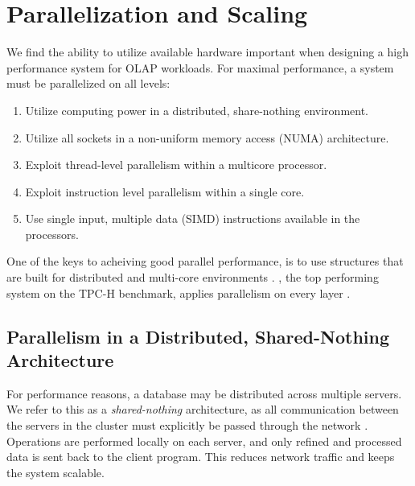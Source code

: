 \chapter{Parallelization and Scaling}
\label{chap:Parallelization and Scaling}

We find the ability to utilize available hardware important when designing a high performance system for OLAP workloads. For maximal performance, a system must be parallelized on all levels:

\begin{enumerate}
  \item Utilize computing power in a distributed, share-nothing environment.
  \item Utilize all sockets in a non-uniform memory access (NUMA) architecture.
  \item Exploit thread-level parallelism within a multicore processor.
  \item Exploit instruction level parallelism within a single core.
  \item Use single input, multiple data (SIMD) instructions available in the processors.
\end{enumerate}

One of the keys to acheiving good parallel performance, is to use structures that are built for distributed and multi-core environments \cite{Primsch2011-ij}. \exasol, the top performing system on the TPC-H benchmark, applies parallelism on every layer \cite{Exasol2014-xh}.

\newpage

\section{Parallelism in a Distributed, Shared-Nothing Architecture}
\label{sec:Parallelism in a Distributed, Shared-Nothing Architecture}
For performance reasons, a database may be distributed across multiple servers. We refer to this as a \textit{shared-nothing} architecture, as all communication between the servers in the cluster must explicitly be passed through the network \cite{DeWitt1992-ki}. Operations are performed locally on each server, and only refined and processed data is sent back to the client program. This reduces network traffic and keeps the system scalable.



